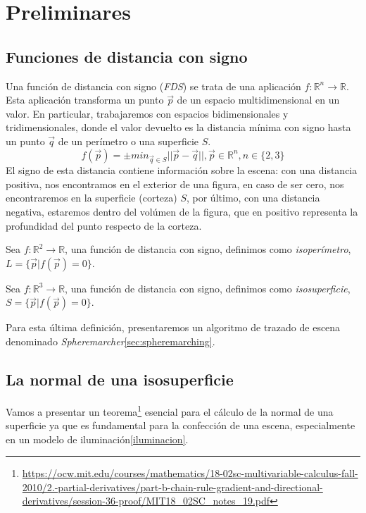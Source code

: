 \chapter{Preliminares}


\section{Funciones de distancia con signo\label{sec:fds}}

Una función de distancia con signo (\textit{FDS}) se trata de una aplicación \(f: \mathbb{R}^n\longrightarrow \mathbb{R}\). Esta aplicación transforma un punto \(\Vec{p}\) de un espacio multidimensional en un valor. En particular, trabajaremos con espacios bidimensionales y tridimensionales, donde el valor devuelto es la distancia mínima con signo hasta un punto \(\Vec{q}\) de un perímetro o una superficie \(S\). 
\[f(\Vec{p})=\pm min_{\Vec{q}\in S}\vert\vert \Vec{p}-\Vec{q} \vert\vert , \Vec{p} \in \mathbb{R}^n, n\in \{2,3\}\]
El signo de esta distancia contiene información sobre la escena: con una distancia positiva, nos encontramos en el exterior de una figura, en caso de ser cero, nos encontraremos en la superficie (corteza) \(S\), por último, con una distancia negativa, estaremos dentro del volúmen de la figura, que en positivo representa la profundidad del punto respecto de la corteza. 

\begin{definition}
	Sea \(f:\mathbb{R}^2\longrightarrow\mathbb{R}\), una función de distancia con signo, definimos como \textit{isoperímetro}, \(L=\{\Vec{p} \vert f(\Vec{p})=0\}\).
\end{definition}

\begin{definition}
	Sea \(f:\mathbb{R}^3\longrightarrow\mathbb{R}\), una función de distancia con signo, definimos como \textit{isosuperficie}, \(S=\{\Vec{p} \vert f(\Vec{p})=0\}\).
\end{definition}

Para esta última definición, presentaremos un algoritmo de trazado de escena denominado \textit{Spheremarcher}\ref{sec:spheremarching}.
\newpage
\section{La normal de una isosuperficie \label{sec:normal}}

Vamos a presentar un teorema\footnote{\url{https://ocw.mit.edu/courses/mathematics/18-02sc-multivariable-calculus-fall-2010/2.-partial-derivatives/part-b-chain-rule-gradient-and-directional-derivatives/session-36-proof/MIT18_02SC_notes_19.pdf}} esencial para el cálculo de la normal de una superficie ya que es fundamental para la confección de una escena, especialmente en un modelo de iluminación\ref{iluminacion}.

